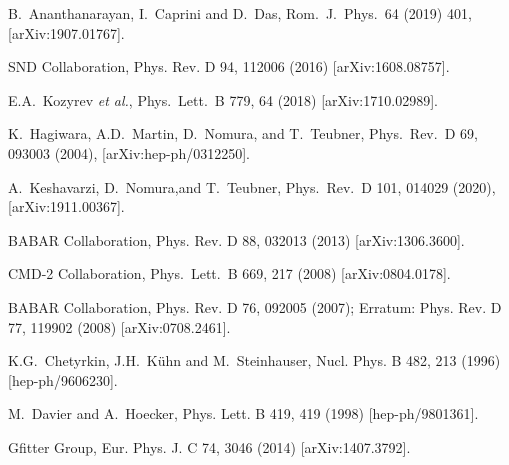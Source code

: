 \begin{thebibliography}{99}
  B.~Ananthanarayan, I.~Caprini and D.~Das,
  Rom.\ J.\ Phys.\ 64 (2019) 401, [arXiv:1907.01767].
  
SND Collaboration, Phys. Rev. D 94, 112006 (2016) [arXiv:1608.08757].

  E.A.~Kozyrev {\it et al.},
  Phys.\ Lett.\ B 779, 64 (2018)
  [arXiv:1710.02989].

 K.~Hagiwara, A.D.~Martin, D.~Nomura, and T.~Teubner, Phys.\ Rev.\ D 69, 093003 (2004), [arXiv:hep-ph/0312250].

 A.~Keshavarzi, D.~Nomura,and   T.~Teubner,   Phys.\  Rev.\ D 101, 014029 (2020), [arXiv:1911.00367].

BABAR Collaboration, Phys. Rev. D 88, 032013 (2013) [arXiv:1306.3600].
  
CMD-2 Collaboration,
  Phys.\ Lett.\ B 669, 217 (2008)
  [arXiv:0804.0178].

BABAR Collaboration, Phys. Rev. D 76, 092005 (2007); Erratum: Phys. Rev. D 77, 119902 (2008) [arXiv:0708.2461].


        K.G.~Chetyrkin, J.H.~K\"uhn and M.~Steinhauser,
                              Nucl. Phys. B 482, 213 (1996) [hep-ph/9606230].

            M.~Davier and A.~Hoecker, Phys. Lett. B 419, 419 (1998) [hep-ph/9801361].

         Gfitter Group, Eur. Phys. J. C 74, 3046 (2014) [arXiv:1407.3792].
   

\end{thebibliography}
